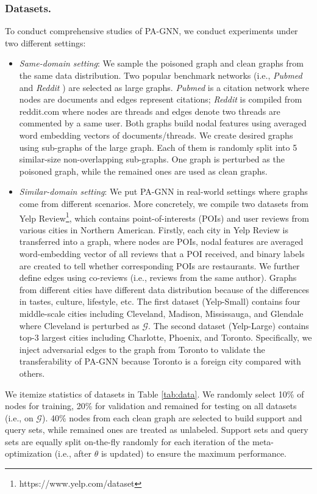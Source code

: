 \documentclass[sigconf]{acmart}
\newcommand{\our}{{PA-GNN}\xspace}
\newcommand{\ours}{{PA-GNN}\xspace}
\def \G {\mathcal{G}}
\begin{document}
\subsubsection{Datasets.}
To conduct comprehensive studies of \our, we conduct experiments under two different settings: 
\begin{itemize}[leftmargin=*]
    \item \textit{Same-domain setting}: We sample the poisoned graph and clean graphs from the same data distribution. Two popular benchmark networks (i.e., \textit{Pubmed} \cite{sen2008collective} and \textit{Reddit} \cite{hamilton2017inductive}) are selected as large graphs. 
    \textit{Pubmed} is a citation network where nodes are documents and edges represent citations; \textit{Reddit} is compiled from reddit.com where nodes are threads and edges denote two threads are commented by a same user. Both graphs build nodal features using averaged word embedding vectors \cite{pennington2014glove} of documents/threads.
    We create desired graphs using sub-graphs of the large graph. Each of them is randomly split into 5 similar-size non-overlapping sub-graphs. One graph is perturbed as the poisoned graph, while the remained ones are used as clean graphs. 
    
    \item \textit{Similar-domain setting}: We put \ours in real-world settings where graphs come from different scenarios. More concretely, we compile two datasets from Yelp Review\footnote{https://www.yelp.com/dataset}, which contains point-of-interests (POIs) and user reviews from various cities in Northern American. Firstly, each city in Yelp Review is transferred into a graph, where nodes are POIs, nodal features are averaged word-embedding vector \cite{pennington2014glove} of all reviews that a POI received, and binary labels are created to tell whether corresponding POIs are restaurants. We further define edges using co-reviews (i.e., reviews from the same author). 
    Graphs from different cities have different data distribution because of the differences in tastes, culture, lifestyle, etc.
    The first dataset (Yelp-Small) contains four middle-scale cities including Cleveland, Madison, Mississauga, and Glendale where Cleveland is perturbed as $\G$. The second dataset (Yelp-Large) contains top-3 largest cities including Charlotte, Phoenix, and Toronto. Specifically, we inject adversarial edges to the graph from Toronto to validate the transferability of \ours because Toronto is a foreign city compared with others.
\end{itemize}
We itemize statistics of datasets in Table \ref{tab:data}. We randomly select 10\% of nodes for training, 20\% for validation and remained for testing on all datasets (i.e., on $\G$). 40\% nodes from each clean graph are selected to build support and query sets, while remained ones are treated as unlabeled. Support sets and query sets are equally split on-the-fly randomly for each iteration of the meta-optimization (i.e., after $\theta$ is updated) to ensure the maximum performance.
\end{document}
